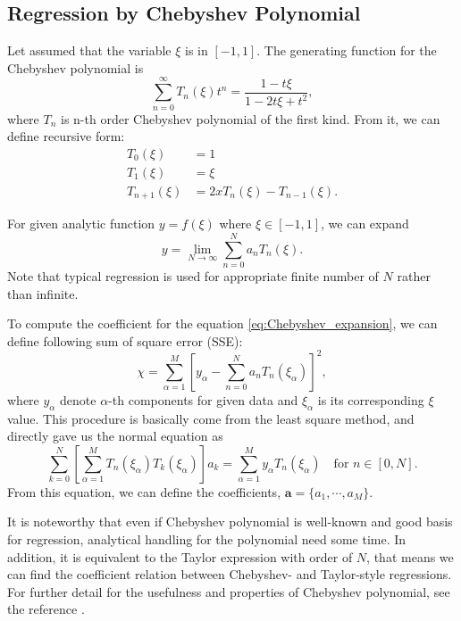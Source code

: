 \message{ !name(brief_Brownian_dynamics.tex)}\documentclass[10pt, a4paper]{report}
\begin{document}
\begin{appendices}
  \section{Regression by Chebyshev Polynomial}
  Let assumed that the variable $\xi$ is in $[-1, 1]$.
  The generating function for the Chebyshev polynomial is
  \begin{equation}
    \sum_{n=0}^{\infty}T_n(\xi)t^n = \frac{1 - t\xi}{1 - 2t\xi + t^2},
  \end{equation}
  where $T_n$ is n-th order Chebyshev polynomial of the first kind. 
  From it, we can define recursive form:
  \begin{align}
    T_0(\xi) & = 1 \\
    T_1(\xi) & = \xi \\
    T_{n+1}(\xi) & = 2xT_n(\xi) - T_{n-1}(\xi).\label{eq:Chebyshev_recursion}
  \end{align}

  For given analytic function $y = f(\xi)$ where $\xi \in [-1, 1]$, we can expand
  \begin{equation}
    y = \lim_{N\to\infty}\sum_{n=0}^{N} a_nT_n(\xi).\label{eq:Chebyshev_expansion}
  \end{equation}
  Note that typical regression is used for appropriate finite number of $N$ rather than infinite. 

  To compute the coefficient for the equation \eqref{eq:Chebyshev_expansion}, we can define following sum of square error (SSE):
  \begin{equation}
    \chi = \sum_{\alpha=1}^{M} \left[y_\alpha - \sum_{n=0}^{N}a_nT_n(\xi_\alpha)\right]^2,
  \end{equation}
  where $y_\alpha$ denote $\alpha$-th components for given data and $\xi_\alpha$ is its corresponding $\xi$ value.
  This procedure is basically come from the least square method, and directly gave us the normal equation as
  \begin{equation}
    \sum_{k=0}^{N}\left[\sum_{\alpha=1}^{M}T_n(\xi_\alpha)T_k(\xi_\alpha)\right]a_k = \sum_{\alpha=1}^{M}y_{\alpha}T_n(\xi_\alpha)\quad\textrm{for } n\in [0, N].
  \end{equation}
  From this equation, we can define the coefficients, $\mathbf{a} = \{a_1,\cdots,a_M\}$.

  It is noteworthy that even if Chebyshev polynomial is well-known and good basis for regression, analytical handling for the polynomial need some time. In addition, it is equivalent to the Taylor expression with order of $N$, that means we can find the coefficient relation between Chebyshev- and Taylor-style regressions.
  For further detail for the usefulness and properties of Chebyshev polynomial, see the reference \textcite{arfken2008mathematical}.



\end{appendices}
\end{document}
